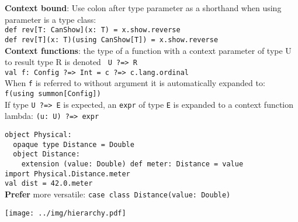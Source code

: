 \documentclass[article, a5paper]{memoir}
\newcommand{\LangColor}{scalared}
\newcommand{\head}[1]{{\bfseries {\color{\LangColor}{#1}}\par\vspace{1mm}\hrule\vspace{-2mm}}}
\newcommand{\code}{\lstinline[basicstyle=\ttfamily]}
\newcommand{\Newline}{\vspace{\baselineskip}}
\newcommand{\Comment}[1]{{\color{commentgreen}{#1}}}
\begin{document}
{\vspace{0.5em}

\textbf{Context bound}: Use colon after type parameter as a shorthand when using parameter is a type class:\\
\code|def rev[T: CanShow](x: T) = x.show.reverse| \hfill\Comment{CanShow[T] is required; automatically expands to:}\\  
\hfill\code|def rev[T](x: T)(using CanShow[T]) = x.show.reverse|   
\\[0.5em]

\textbf{Context functions}: the type of a function with a context parameter of type U to result type R is denoted \code| U ?=> R|\\
\code|val f: Config ?=> Int = c ?=> c.lang.ordinal|\hfill\Comment{a context function lambda, c is a using-param.} \\
When \code{f} is referred to without argument it is automatically expanded to: \code{ f(using summon[Config])}\\
If type \code|U ?=> E| is expected, an \code{expr} of type \code{E} is expanded to a context function lambda: \code{(u: U) ?=> expr} 
}

\vspace{0.5em}\head{Opaque types: zero-cost abstractions}\Newline 

{\small

  \code|object Physical:| \hfill\Comment{Create a local scope for our opaque type alias}\\
  \code|  opaque type Distance = Double |  \hfill\Comment{alias of Distance is Double, but that is invisible outside Physical} \\
  \code|  object Distance:| \hfill\Comment{In the local scope it is known that Distance is actually Double} \\
  \code|    extension (value: Double) def meter: Distance = value|\\
  \Comment{Make the opaque type alias member available:} \hfill\code|import Physical.Distance.meter| \\
  \Comment{ Type of dist is Distance and members of type Double not available on dist:} \hfill\code|val dist = 42.0.meter| \\
  \textbf{Prefer} more versatile: \code{case class Distance(value: Double)}\hfill\Comment{if zero allocation not performance-critical.}
}%





\clearpage
\vspace*{-2.5em}\head{The Scala Type System}%
\vspace{-0.0em}\texttt{[image: ../img/hierarchy.pdf]}
\end{document}
